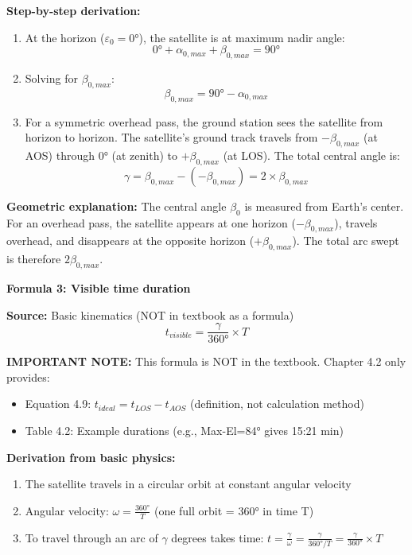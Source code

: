 \documentclass[11pt,letterpaper]{article}
\begin{document}
\textbf{Step-by-step derivation:}
\begin{enumerate}
    \item At the horizon ($\varepsilon_0 = 0°$), the satellite is at maximum nadir angle:
    \begin{equation}
    0° + \alpha_{0,max} + \beta_{0,max} = 90°
    \end{equation}

    \item Solving for $\beta_{0,max}$:
    \begin{equation}
    \beta_{0,max} = 90° - \alpha_{0,max}
    \end{equation}

    \item For a symmetric overhead pass, the ground station sees the satellite from horizon to horizon. The satellite's ground track travels from $-\beta_{0,max}$ (at AOS) through 0° (at zenith) to $+\beta_{0,max}$ (at LOS). The total central angle is:
    \begin{equation}
    \gamma = \beta_{0,max} - (-\beta_{0,max}) = 2 \times \beta_{0,max}
    \end{equation}
\end{enumerate}

\textbf{Geometric explanation:} The central angle $\beta_0$ is measured from Earth's center. For an overhead pass, the satellite appears at one horizon ($-\beta_{0,max}$), travels overhead, and disappears at the opposite horizon ($+\beta_{0,max}$). The total arc swept is therefore $2\beta_{0,max}$.

\vspace{0.3cm}

\textbf{Formula 3: Visible time duration}

\textbf{Source:} Basic kinematics (NOT in textbook as a formula)
\begin{equation}
t_{visible} = \frac{\gamma}{360°} \times T
\end{equation}

\textbf{IMPORTANT NOTE:} This formula is NOT in the textbook. Chapter 4.2 only provides:
\begin{itemize}
    \item Equation 4.9: $t_{ideal} = t_{LOS} - t_{AOS}$ (definition, not calculation method)
    \item Table 4.2: Example durations (e.g., Max-El=84° gives 15:21 min)
\end{itemize}

\textbf{Derivation from basic physics:}
\begin{enumerate}
    \item The satellite travels in a circular orbit at constant angular velocity
    \item Angular velocity: $\omega = \frac{360°}{T}$ (one full orbit = 360° in time T)
    \item To travel through an arc of $\gamma$ degrees takes time: $t = \frac{\gamma}{\omega} = \frac{\gamma}{360°/T} = \frac{\gamma}{360°} \times T$
\end{enumerate}
\end{document}

